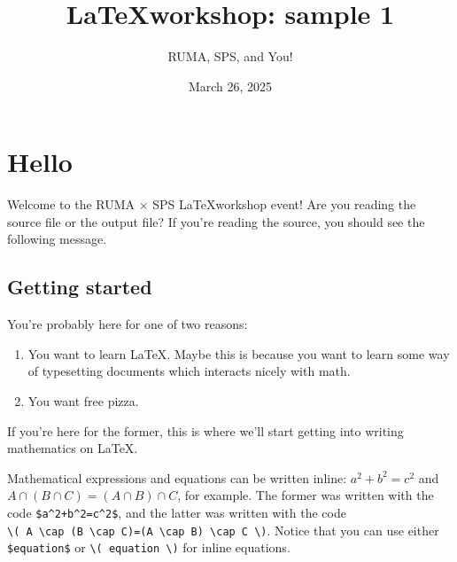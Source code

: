 \documentclass{article}
\title{\LaTeX workshop: sample 1}
\author{RUMA, SPS, and You!}
\date{March 26, 2025}
\begin{document}
\maketitle %

\section{Hello} %
Welcome to the RUMA$\,\times\,$SPS \LaTeX workshop event! Are you reading the source file or the output file? If you're reading the source, you should see the following message. %



\subsection{Getting started} %
You're probably here for one of two reasons:
\begin{enumerate}
    \item You want to learn \LaTeX. Maybe this is because you want to learn some way of typesetting documents which interacts nicely with math.
    \item You want free pizza.
\end{enumerate}
If you're here for the former, this is where we'll start getting into writing mathematics on \LaTeX.

Mathematical expressions and equations can be written inline: $a^2+b^2=c^2$ and \( A \cap (B \cap C)=(A \cap B) \cap C \), for example. The former was written with the code \texttt{\$a\^{}2+b\^{}2=c\^{}2\$}, and the latter was written with the code \\ \texttt{\textbackslash( A \textbackslash cap (B \textbackslash cap C)=(A \textbackslash cap B) \textbackslash cap C \textbackslash)}. Notice that you can use either \texttt{\$equation\$} or \texttt{\textbackslash( equation \textbackslash)} for inline equations.
\end{document}
